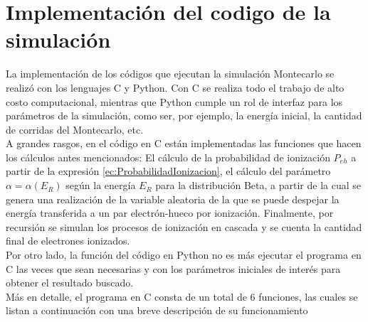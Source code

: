 \appendix
\chapter{Implementación del codigo de la simulación}
\noindent La implementación de los códigos que ejecutan la simulación Montecarlo se realizó con los lenguajes C y Python. Con C se realiza todo el trabajo de alto costo computacional, mientras que Python cumple un rol de interfaz para los parámetros de la simulación, como ser, por ejemplo, la energía inicial, la cantidad de corridas del Montecarlo, etc.\\
\indent A grandes rasgos, en el código en C están implementadas las funciones que hacen los cálculos antes mencionados: El cálculo de la probabilidad de ionización $P_{eh}$ a partir de la expresión \eqref{ec:ProbabilidadIonizacion}, el cálculo del parámetro $\alpha = \alpha(E_{R})$ según la energía $E_{R}$ para la distribución Beta, a partir de la cual se genera una realización de la variable aleatoria de la que se puede despejar la energía transferida a un par electrón-hueco por ionización. Finalmente, por recursión se simulan los procesos de ionización en cascada y se cuenta la cantidad final de electrones ionizados.\\
\indent Por otro lado, la función del código en Python no es más ejecutar el programa en C las veces que sean necesarias y con los parámetros iniciales de interés para obtener el resultado buscado.\\
\indent Más en detalle, el programa en C consta de un total de $6$ funciones, las cuales se listan a continuación con una breve descripción de su funcionamiento
